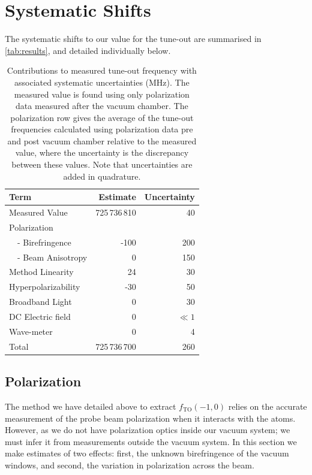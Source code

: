 \documentclass[%
 amsmath,amssymb,
aps,
]{revtex4-2}
\begin{document}
\section{Systematic Shifts}
The systematic shifts to our value for the tune-out are summarised in \autoref{tab:results}, and detailed individually below.
\begin{table}[t]
\centering
\begin{ruledtabular}
\begin{tabular}{l|r|r}
Term              & Estimate &  Uncertainty \\
\hline
Measured Value      & 725\,736\,810             & 40      \\
Polarization        & & \\
\, \, - Birefringence & -100                   & 200   \\
\, \, - Beam Anisotropy & 0                   & 150   \\
Method Linearity    & 24                   & 30       \\
Hyperpolarizability           & -30                   & 50   \\
Broadband Light     & 0                     & 30      \\
DC Electric field   & 0                     & \(\ll 1\) \\
Wave-meter          & 0                     & 4    \\
\hline
Total               &  725\,736\,700            &  260
\end{tabular}
\end{ruledtabular}
\caption{Contributions to measured tune-out frequency with associated systematic uncertainties (MHz). The measured value is found using only polarization data measured after the vacuum chamber. The polarization row gives the average of the tune-out frequencies calculated using polarization data pre and post vacuum chamber relative to the measured value, where the uncertainty is the discrepancy between these values. Note that uncertainties are added in quadrature.}
\label{tab:results}
\end{table}

\subsection{Polarization}
 The method we have detailed above to extract \(f_{\mathrm{TO}}(-1,0)\) relies on the accurate measurement of the probe beam polarization when it interacts with the atoms. However, as we do not have polarization optics inside our vacuum system; we must infer it from measurements outside the vacuum system. In this section we make estimates of two effects: first, the unknown birefringence of the vacuum windows, and second, the variation in polarization across the beam.
 
\end{document}

